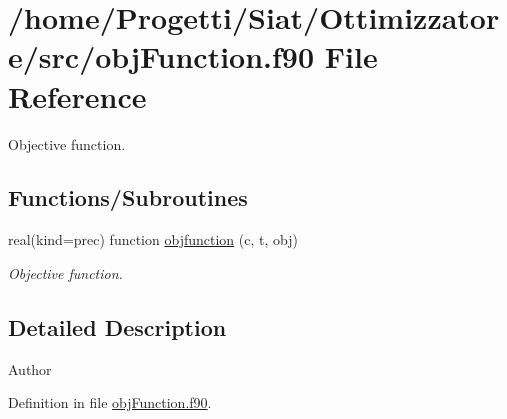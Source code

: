 \hypertarget{obj_function_8f90}{\section{/home/\-Progetti/\-Siat/\-Ottimizzatore/src/obj\-Function.f90 File Reference}
\label{obj_function_8f90}
}


Objective function.  


\subsection*{Functions/\-Subroutines}
\begin{DoxyCompactItemize}
\item 
real(kind=prec) function \hyperlink{obj_function_8f90_a8586ea0db25d91bd8ca4ce412f7a397c}{objfunction} (c, t, obj)
\begin{DoxyCompactList}\small\item\em Objective function. \end{DoxyCompactList}\end{DoxyCompactItemize}


\subsection{Detailed Description}
\begin{DoxyAuthor}{Author}

\end{DoxyAuthor}


Definition in file \hyperlink{obj_function_8f90_source}{obj\-Function.\-f90}.




